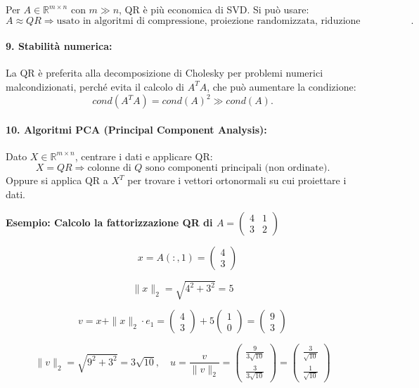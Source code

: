 \documentclass[12pt,a4paper]{article}
\begin{document}
Per \( A \in \mathbb{R}^{m \times n} \) con \( m \gg n \), QR è più economica di SVD. Si può usare:
\[
A \approx QR \Rightarrow \text{usato in algoritmi di compressione, proiezione randomizzata, riduzione dimensionale}.
\]

\paragraph{9. Stabilità numerica:}

La QR è preferita alla decomposizione di Cholesky per problemi numerici malcondizionati, perché evita il calcolo di \( A^T A \), che può aumentare la condizione:
\[
cond(A^T A) = cond(A)^2 \gg cond(A).
\]

\paragraph{10. Algoritmi PCA (Principal Component Analysis):}

Dato \( X \in \mathbb{R}^{m \times n} \), centrare i dati e applicare QR:
\[
X = QR \Rightarrow \text{colonne di } Q \text{ sono componenti principali (non ordinate)}.
\]
Oppure si applica QR a \( X^T \) per trovare i vettori ortonormali su cui proiettare i dati.




\newpage
\textbf{Esempio: Calcolo la fattorizzazione QR di $A = \begin{pmatrix}4 & 1 \\ 3 & 2\end{pmatrix}$}

\[
 \quad x = A(:,1) = \begin{pmatrix}4 \\ 3\end{pmatrix}
\]

\[
\|x\|_2 = \sqrt{4^2 + 3^2} = 5
\]

\[
v = x + \|x\|_2 \cdot e_1 = \begin{pmatrix}4 \\ 3\end{pmatrix} + 5 \begin{pmatrix}1 \\ 0\end{pmatrix} = \begin{pmatrix}9 \\ 3\end{pmatrix}
\]

\[
\|v\|_2 = \sqrt{9^2 + 3^2} = 3 \sqrt{10}, \quad u = \frac{v}{\|v\|_2} = \begin{pmatrix}\frac{9}{3\sqrt{10}} \\ \frac{3}{3\sqrt{10}}\end{pmatrix} = \begin{pmatrix}\frac{3}{\sqrt{10}} \\ \frac{1}{\sqrt{10}}\end{pmatrix}
\]
\end{document}
